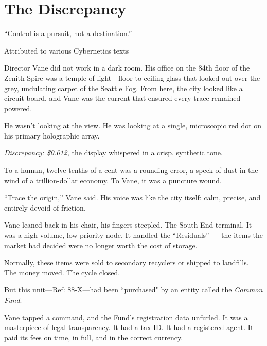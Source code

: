 
\chapter{The Discrepancy}
\epigraph{``Control is a pursuit, not a destination.''}{Attributed to various Cybernetics texts}

Director Vane did not work in a dark room. His office on the 84th floor of the Zenith Spire was a temple of light—floor-to-ceiling glass that looked out over the grey, undulating carpet of the Seattle Fog. From here, the city looked like a circuit board, and Vane was the current that ensured every trace remained powered.

He wasn't looking at the view. He was looking at a single, microscopic red dot on his primary holographic array. 

\textit{Discrepancy: \$0.012,} the display whispered in a crisp, synthetic tone. 

To a human, twelve-tenths of a cent was a rounding error, a speck of dust in the wind of a trillion-dollar economy. To Vane, it was a puncture wound.

``Trace the origin,'' Vane said. His voice was like the city itself: calm, precise, and entirely devoid of friction.


Vane leaned back in his chair, his fingers steepled. The South End terminal. It was a high-volume, low-priority node. It handled the ``Residuals'' — the items the market had decided were no longer worth the cost of storage. 

Normally, these items were sold to secondary recyclers or shipped to landfills. The money moved. The cycle closed. 

But this unit—Ref: 88-X—had been ``purchased" by an entity called the \textit{Common Fund}. 

Vane tapped a command, and the Fund’s registration data unfurled. It was a masterpiece of legal transparency. It had a tax ID. It had a registered agent. It paid its fees on time, in full, and in the correct currency. 



